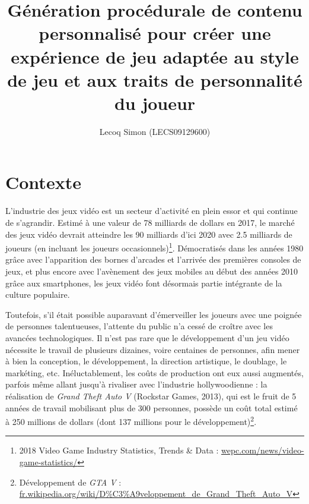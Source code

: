\documentclass[a4paper,11pt]{article}
\title{Génération procédurale de contenu personnalisé pour créer une expérience de jeu adaptée au style de jeu et aux traits de personnalité du joueur}
\author{Lecoq Simon (LECS09129600)}
\date{}
\begin{document}
    \maketitle
    \setlength{\parskip}{1em}

    \section{Contexte}
    
      L'industrie des jeux vidéo est un secteur d'activité en plein essor et qui continue de s'agrandir. 
      Estimé à une valeur de 78 milliards de dollars en 2017, le marché des jeux vidéo devrait atteindre les 90 milliards d'ici 2020 avec 2.5 milliards de joueurs (en incluant les joueurs occasionnels)\footnote{2018 Video Game Industry Statistics, Trends \& Data : \url{wepc.com/news/video-game-statistics/}}.
      Démocratisés dans les années 1980 grâce avec l'apparition des bornes d'arcades et l'arrivée des premières consoles de jeux, et plus encore avec l'avènement des jeux mobiles au début des années 2010 grâce aux smartphones, les jeux vidéo font désormais partie intégrante de la culture populaire.
    
      Toutefois, s'il était possible auparavant d'émerveiller les joueurs avec une poignée de personnes talentueuses, l'attente du public n'a cessé de croître avec les avancées technologiques. 
      Il n'est pas rare que le développement d'un jeu vidéo nécessite le travail de plusieurs dizaines, voire centaines de personnes, afin mener à bien la conception, le développement, la direction artistique, le doublage, le markéting, etc.
      Inéluctablement, les coûts de production ont eux aussi augmentés, parfois même allant jusqu'à rivaliser avec l'industrie hollywoodienne : 
      la réalisation de \textit{Grand Theft Auto V} (Rockstar Games, 2013), qui est le fruit de 5 années de travail mobilisant plus de 300 personnes, possède un coût total estimé à 250 millions de dollars (dont 137 millions pour le développement)\footnote{Développement de \textit{GTA V} : \url{fr.wikipedia.org/wiki/D\%C3\%A9veloppement_de_Grand_Theft_Auto_V}}.
\end{document}
